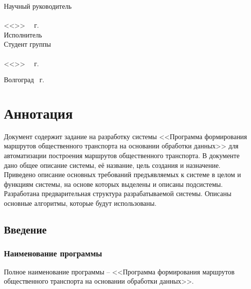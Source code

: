 \begin{minipage}[t]{0.39\textwidth}
    \begin{flushleft}
        Научный руководитель\\
        \underline{}\\
        <<\LINE{1.5em}>>\ \LINE{7em} \the\year\ г.\\
        Исполнитель\\
        Студент группы\\
        \underline{}\\
        <<\LINE{1.5em}>>\ \LINE{7em} \the\year\ г.\\
    \end{flushleft}
\end{minipage}
\vspace{\fill}
\begin{center}
    Волгоград \the\year\ г.
\end{center}
\newpage

\tocless\part{Аннотация}
Документ содержит задание на разработку системы <<Программа формирования маршрутов общественного транспорта 
на основании обработки данных>> для автоматизации построения маршрутов общественного транспорта. В документе 
дано общее описание системы, её название, цель создания и назначение. Приведено описание основных требований 
предъявляемых к системе в целом и функциям системы, на основе которых выделены и описаны подсистемы. 
Разработана предварительная структура разрабатываемой системы. Описаны основные алгоритмы, которые будут 
использованы.
\newpage

\startcontents[sections]
\begin{changemargin}{-0.5cm}{0pt}
\end{changemargin}

\newpage

\chapter{Введение}
\section{Наименование программы}
Полное наименование программы -- <<Программа формирования маршрутов 
общественного транспорта на основании обработки данных>>.

